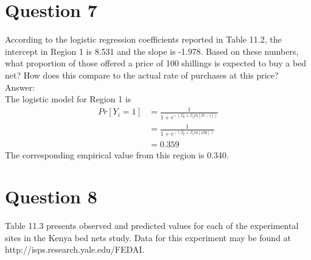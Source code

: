 \documentclass[11pt,notitlepage]{article}\usepackage[]{graphicx}\usepackage[]{color}
\begin{document}
\section*{Question 7}
According to the logistic regression coefficients reported in Table 11.2, the intercept in Region 1 is 8.531 and the slope is -1.978. Based on these numbers, what proportion of those offered a price of 100 shillings is expected to buy a bed net? How does this compare to the actual rate of purchases at this price?\\
Answer:\\
The logistic model for Region 1 is 
\begin{align*}
Pr[Y_i=1] &= \frac{1}{1+e^{-(\beta_0 + \beta_1 ln[D-i])}}\\
&= \frac{1}{1+e^{-(\beta_0 + \beta_1 ln[100])}}\\
&=0.359
\end{align*}
The corresponding empirical value from this region is 0.340.


\section*{Question 8}
Table 11.3 presents observed and predicted values for each of the experimental sites in the Kenya bed nets study. Data for this experiment may be found at http://isps.research.yale.edu/FEDAI.
\end{document}
